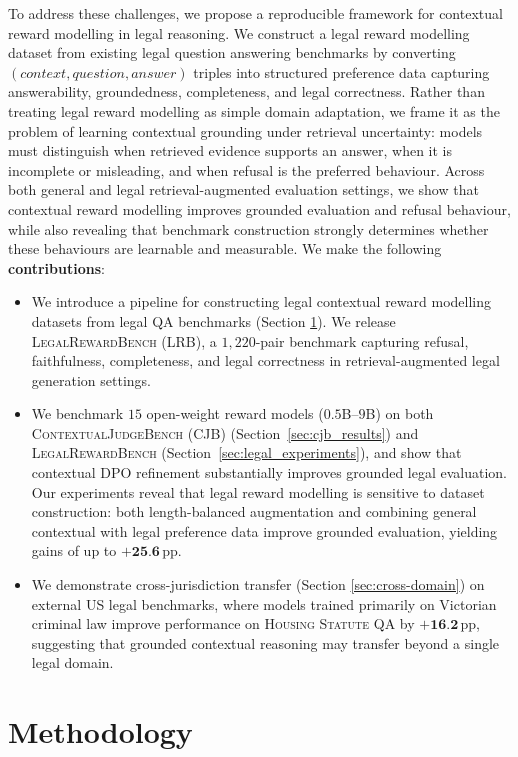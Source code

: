 \documentclass{article}
\theoremstyle{plain}
\theoremstyle{definition}
\theoremstyle{remark}
\begin{document}
To address these challenges, we propose a reproducible framework for contextual reward modelling in legal reasoning. We construct a legal reward modelling dataset from existing legal question answering benchmarks by converting $(context, question, answer)$ triples into structured preference data capturing answerability, groundedness, completeness, and legal correctness. Rather than treating legal reward modelling as simple domain adaptation, we frame it as the problem of learning contextual grounding under retrieval uncertainty: models must distinguish when retrieved evidence supports an answer, when it is incomplete or misleading, and when refusal is the preferred behaviour. Across both general and legal retrieval-augmented evaluation settings, we show that contextual reward modelling improves grounded evaluation and refusal behaviour, while also revealing that benchmark construction strongly determines whether these behaviours are learnable and measurable. We make the following \textbf{contributions}:
\begin{itemize}
    \item We introduce a pipeline for constructing legal contextual reward modelling datasets from legal QA benchmarks (Section \ref{sec:methodology}). We release \textsc{LegalRewardBench} (LRB), a $1{,}220$-pair benchmark capturing refusal, faithfulness, completeness, and legal correctness in retrieval-augmented legal generation settings.
    \item We benchmark $15$ open-weight reward models ($0.5$B--$9$B) on both \textsc{ContextualJudgeBench} (CJB) (Section~\ref{sec:cjb_results}) and \textsc{LegalRewardBench} (Section~\ref{sec:legal_experiments}), and show that contextual DPO refinement substantially improves grounded legal evaluation. Our experiments reveal that legal reward modelling is sensitive to dataset construction: both length-balanced augmentation and combining general contextual with legal preference data improve grounded evaluation, yielding gains of up to $\textbf{+25.6}$\,pp.
    \item We demonstrate cross-jurisdiction transfer (Section \ref{sec:cross-domain}) on external US legal benchmarks, where models trained primarily on Victorian criminal law improve performance on \textsc{Housing Statute QA} by $\textbf{+16.2}$\,pp, suggesting that grounded contextual reasoning may transfer beyond a single legal domain.
\end{itemize}


\section{Methodology}
\label{sec:methodology}
\end{document}
